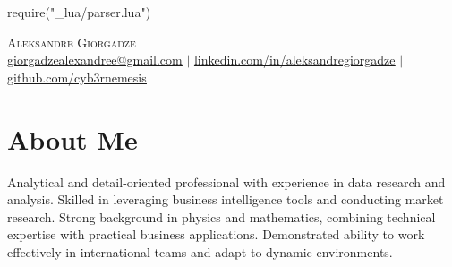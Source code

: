 \documentclass[letterpaper,11pt]{article}
\newcommand{\sectionspace}{\vspace{4.5pt}}  %
\begin{document}
\begin{luacode}
require("_lua/parser.lua")
\end{luacode}


\begin{center}
    \vspace{10pt}  %
    {\Huge \scshape Aleksandre Giorgadze} \\ \vspace{8pt}
    \small
    \href{mailto:giorgadzealexandree@gmail.com}{\underline{giorgadzealexandree@gmail.com}} $|$ 
    \href{https://www.linkedin.com/in/aleksandregiorgadze/}{\underline{linkedin.com/in/aleksandregiorgadze}} $|$
    \href{https://github.com/cyb3rnemesis}{\underline{github.com/cyb3rnemesis}}
\end{center}

\section{About Me}
Analytical and detail-oriented professional with experience in data research and analysis. Skilled in leveraging business intelligence tools and conducting market research. Strong background in physics and mathematics, combining technical expertise with practical business applications. Demonstrated ability to work effectively in international teams and adapt to dynamic environments.
\sectionspace

\end{document}
